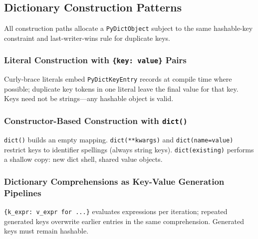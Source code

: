 \subsection{Dictionary Construction Patterns}

All construction paths allocate a \texttt{PyDictObject} subject to the same hashable-key constraint and last-writer-wins rule for duplicate keys.

\subsubsection{Literal Construction with \texttt{\{key: value\}} Pairs}

Curly-brace literals embed \texttt{PyDictKeyEntry} records at compile time where possible; duplicate key tokens in one literal leave the final value for that key. Keys need not be strings---any hashable object is valid.

\subsubsection{Constructor-Based Construction with \texttt{dict()}}

\texttt{dict()} builds an empty mapping. \texttt{dict(**kwargs)} and \texttt{dict(name=value)} restrict keys to identifier spellings (always string keys). \texttt{dict(existing)} performs a shallow copy: new dict shell, shared value objects.

\subsubsection{Dictionary Comprehensions as Key-Value Generation Pipelines}

\texttt{\{k\_expr: v\_expr for ...\}} evaluates expressions per iteration; repeated generated keys overwrite earlier entries in the same comprehension. Generated keys must remain hashable.
